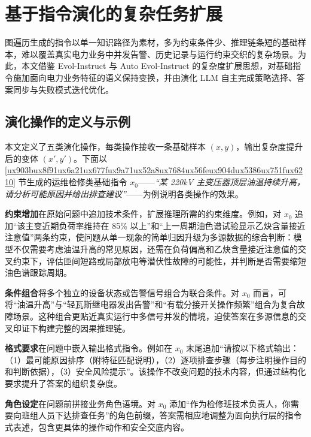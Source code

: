 \documentclass[fontset=fandol,type=master,campus=shenzhen,etitleauto=true]{hithesisbook}
\begin{document}
\section{基于指令演化的复杂任务扩展}\label{ux57faux4e8eux6307ux4ee4ux6f14ux5316ux7684ux590dux6742ux4efbux52a1ux6269ux5c55}

图遍历生成的指令以单一知识路径为素材，多为约束条件少、推理链条短的基础样本，难以覆盖真实电力业务中并发告警、历史记录与运行约束交织的复杂场景。为此，本文借鉴 Evol-Instruct\cite{ref25} 与 Auto Evol-Instruct\cite{ref53} 的复杂度扩展思想，对基础指令施加面向电力业务特征的语义保持变换，并由演化 LLM 自主完成策略选择、答案同步与失败模式迭代优化。

\subsection{演化操作的定义与示例}\label{ux9762ux5411ux4e03ux7c7bux6570ux636eux7c7bux578bux7684ux5deeux5f02ux5316ux6307ux4ee4ux6f14ux5316}

本文定义了五类演化操作，每类操作接收一条基础样本 $(x, y)$，输出复杂度提升后的变体 $(x', y')$。下面以 \ref{ux903bux8f91ux6a21ux677fux9a71ux52a8ux7684ux56feux904dux5386ux751fux6210} 节生成的运维检修类基础指令 $x_0$——\emph{“某 220kV 主变压器顶层油温持续升高，请分析可能原因并给出排查建议”}——为例说明各类操作的效果。

\textbf{约束增加}在原始问题中追加技术条件，扩展推理所需的约束维度。例如，对 $x_0$ 追加``该主变近期负荷率维持在 85\% 以上''和``上一周期油色谱试验显示乙炔含量接近注意值''两条约束，使问题从单一现象的简单归因升级为多源数据的综合判断：模型不仅需要考虑油温升高的常见原因，还需在负荷偏高和乙炔含量接近注意值的交叉约束下，评估匝间短路或局部放电等潜伏性故障的可能性，并判断是否需要缩短油色谱跟踪周期。

\textbf{条件组合}将多个独立的设备状态或告警信号组合为联合条件。对 $x_0$ 而言，可将``油温升高''与``轻瓦斯继电器发出告警''和``有载分接开关操作频繁''组合为复合故障场景。这种组合更贴近真实运行中多信号并发的情境，迫使答案在多源信息的交叉印证下构建完整的因果推理链。

\textbf{格式要求}在问题中嵌入输出格式指令。例如在 $x_0$ 末尾追加``请按以下格式输出：（1）最可能原因排序（附特征匹配说明），（2）逐项排查步骤（每步注明操作目的和判断依据），（3）安全风险提示''。该操作不改变问题的技术内容，但通过结构化要求提升了答案的组织复杂度。

\textbf{角色设定}在问题前拼接业务角色语境。对 $x_0$ 添加``作为检修班技术负责人，你需要向班组人员下达排查任务''的角色前缀，答案需相应地调整为面向执行层的指令式表述，包含更具体的操作动作和安全交底内容。
\end{document}

